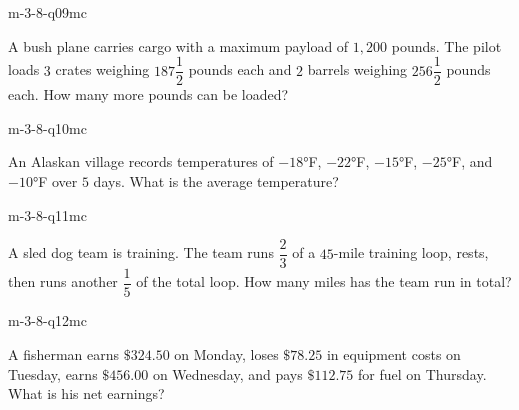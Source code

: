 \begin{practiceQuestion}{m-3-8-q09}{mc}
\begin{questionText}
A bush plane carries cargo with a maximum payload of $1{,}200$ pounds. The pilot loads $3$ crates weighing $187\dfrac{1}{2}$ pounds each and $2$ barrels weighing $256\dfrac{1}{2}$ pounds each. How many more pounds can be loaded?
\end{questionText}
\end{practiceQuestion}

\begin{practiceQuestion}{m-3-8-q10}{mc}
\begin{questionText}
An Alaskan village records temperatures of $-18°$F, $-22°$F, $-15°$F, $-25°$F, and $-10°$F over $5$ days. What is the average temperature?
\end{questionText}
\end{practiceQuestion}

\begin{practiceQuestion}{m-3-8-q11}{mc}
\begin{questionText}
A sled dog team is training. The team runs $\dfrac{2}{3}$ of a $45$-mile training loop, rests, then runs another $\dfrac{1}{5}$ of the total loop. How many miles has the team run in total?
\end{questionText}
\end{practiceQuestion}

\begin{practiceQuestion}{m-3-8-q12}{mc}
\begin{questionText}
A fisherman earns $\$324.50$ on Monday, loses $\$78.25$ in equipment costs on Tuesday, earns $\$456.00$ on Wednesday, and pays $\$112.75$ for fuel on Thursday. What is his net earnings?
\end{questionText}
\end{practiceQuestion}

